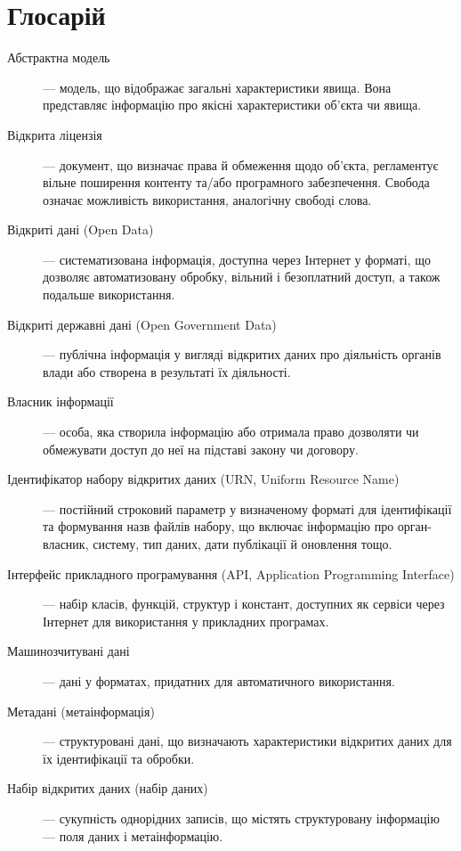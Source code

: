 \chapter{Глосарій}
\label{sec:glossary}

\begin{description}
\item[Абстрактна модель] — модель, що відображає загальні характеристики явища. Вона представляє інформацію про якісні характеристики об'єкта чи явища.
\item[Відкрита ліцензія] — документ, що визначає права й обмеження щодо об'єкта, регламентує вільне поширення контенту та/або програмного забезпечення. Свобода означає можливість використання, аналогічну свободі слова.
\item[Відкриті дані (Open Data)] — систематизована інформація, доступна через Інтернет у форматі, що дозволяє автоматизовану обробку, вільний і безоплатний доступ, а також подальше використання.
\item[Відкриті державні дані (Open Government Data)] — публічна інформація у вигляді відкритих даних про діяльність органів влади або створена в результаті їх діяльності.
\item[Власник інформації] — особа, яка створила інформацію або отримала право дозволяти чи обмежувати доступ до неї на підставі закону чи договору.
\item[Ідентифікатор набору відкритих даних (URN, Uniform Resource Name)] — постійний строковий параметр у визначеному форматі для ідентифікації та формування назв файлів набору, що включає інформацію про орган-власник, систему, тип даних, дати публікації й оновлення тощо.
\item[Інтерфейс прикладного програмування (API, Application Programming Interface)] — набір класів, функцій, структур і констант, доступних як сервіси через Інтернет для використання у прикладних програмах.
\item[Машинозчитувані дані] — дані у форматах, придатних для автоматичного використання.
\item[Метадані (метаінформація)] — структуровані дані, що визначають характеристики відкритих даних для їх ідентифікації та обробки.
\item[Набір відкритих даних (набір даних)] — сукупність однорідних записів, що містять структуровану інформацію — поля даних і метаінформацію.
\end{description}
